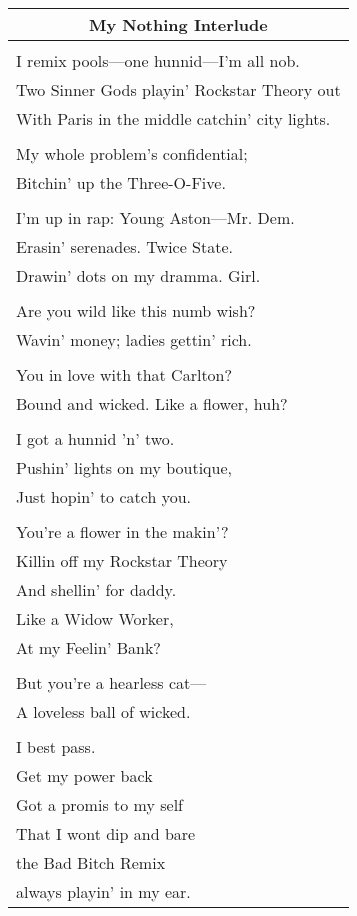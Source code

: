 \documentclass{article}
\begin{document}

\begin{center}
\begin{tabular}{l}
\multicolumn{1}{c}{\textbf{My Nothing Interlude}} \\ \hline
\\
I remix pools---one hunnid---I'm all nob. \\
Two Sinner Gods playin' Rockstar Theory out \\
With Paris in the middle catchin' city lights. \\
\\
My whole problem's confidential; \\
Bitchin' up the Three-O-Five. \\
\\
I'm up in rap: Young Aston---Mr. Dem. \\
Erasin' serenades. Twice State. \\
Drawin' dots on my dramma. Girl. \\
\\
Are you wild like this numb wish? \\
Wavin' money; ladies gettin' rich. \\
\\
You in love with that Carlton? \\
Bound and wicked. Like a flower, huh? \\
\\
I got a hunnid 'n' two. \\
Pushin' lights on my boutique, \\
Just hopin' to catch you. \\
\\
You're a flower in the makin'? \\
Killin off my Rockstar Theory \\
And shellin' for daddy. \\
Like a Widow Worker, \\
At my Feelin' Bank? \\
\\
But you're a hearless cat--- \\
A loveless ball of wicked. \\
\\
I best pass. \\
Get my power back \\
Got a promis to my self \\
That I wont dip and bare \\
the Bad Bitch Remix \\
always playin' in my ear. \\
\end{tabular}
\end{center}
\end{document}
